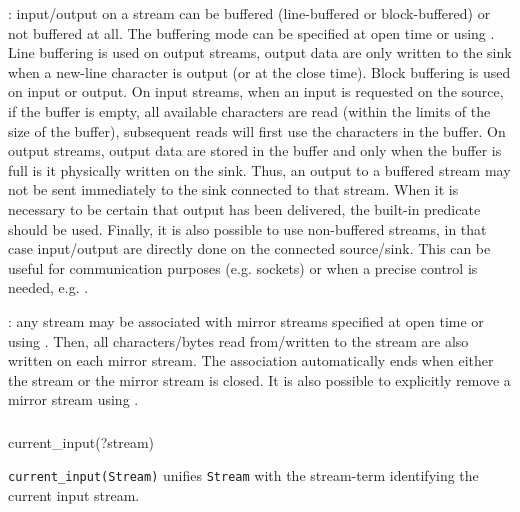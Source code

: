 : input/output on a stream can be buffered
(line-buffered or block-buffered) or not buffered at all. The buffering mode
can be specified at open time or using 
. Line buffering is used on output streams,
output data are only written to the sink when a new-line character is output
(or at the close time). Block buffering is used on input or output. On input
streams, when an input is requested on the source, if the buffer is empty,
all available characters are read (within the limits of the size of the
buffer), subsequent reads will first use the characters in the buffer. On
output streams, output data are stored in the buffer and only when the
buffer is full is it physically written on the sink. Thus, an output to a
buffered stream may not be sent immediately to the sink connected to that
stream. When it is necessary to be certain that output has been delivered,
the built-in predicate  
should be used. Finally, it is also possible to use non-buffered streams, in
that case input/output are directly done on the connected source/sink. This
can be useful for communication purposes (e.g. sockets) or when a precise
control is needed, e.g.  .

: any stream may be associated with mirror streams
specified at open time or using 
. Then, all characters/bytes read from/written to
the stream are also written on each mirror stream.  The association
automatically ends when either the stream or the mirror stream is closed. It
is also possible to explicitly remove a mirror stream using
.


\subsubsection{}

\begin{TemplatesOneCol}
current\_input(?stream)

\end{TemplatesOneCol}

\Description

\texttt{current\_input(Stream)} unifies \texttt{Stream} with the stream-term
identifying the current input stream.

\begin{PlErrors}


\end{PlErrors}

